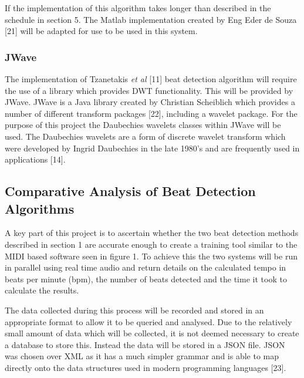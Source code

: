 \documentclass[a4paper, 11pt]{article}
\begin{document}
If the implementation of this algorithm takes longer than described in the schedule in   section 5. The Matlab implementation created by Eng Eder de Souza [21] will be adapted for use to be used in this system. 

\subsubsection{JWave}
The implementation of Tzanetakis \textit{et al} [11] beat detection algorithm will require the use of a library which provides DWT functionality. This will be provided by JWave. JWave is a Java library created by Christian Scheiblich which provides a number of different transform packages [22], including a wavelet package. For the purpose of this project the Daubechies wavelets classes within JWave will be used. The Daubechies wavelets are a form of discrete wavelet transform which were developed by Ingrid Daubechies in the late 1980's and are frequently used in applications [14]. 

\subsection{Comparative Analysis of Beat Detection Algorithms}
A key part of this project is to ascertain whether the two beat detection methods described in section 1 are accurate enough to create a training tool similar to the MIDI based software seen in figure 1. To achieve this the two systems will be run in parallel using real time audio and return details on the calculated tempo in beats per minute (bpm), the number of beats detected and the time it took to calculate the results. 

The data collected during this process will be recorded and stored in an appropriate format to allow it to be queried and analysed. Due to the relatively small amount of data which will be collected, it is not deemed necessary to create a database to store this. Instead the data will be stored in a JSON file. JSON was chosen over XML as it has a much simpler grammar and is able to map directly onto the data structures used in modern programming languages [23].
\end{document}
